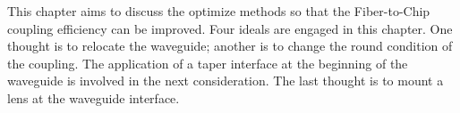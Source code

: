 This chapter aims to discuss the optimize methods so that the Fiber-to-Chip coupling efficiency can be improved. Four ideals are engaged in this chapter. One thought is to relocate the waveguide; another is to change the round condition of the coupling. The application of a taper interface at the beginning of the waveguide is involved in the next consideration. The last thought is to mount a lens at the waveguide interface.
